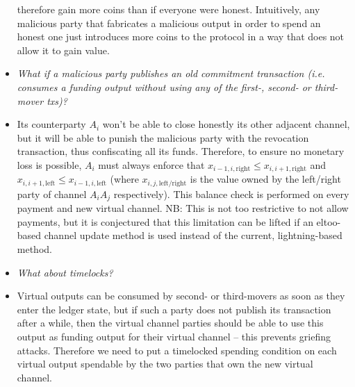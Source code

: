 \begin{itemize}
  therefore gain more coins than if everyone were honest. Intuitively, any
  malicious party that fabricates a malicious output in order to spend an honest
  one just introduces more coins to the protocol in a way that does not allow it
  to gain value.
  \item \emph{What if a malicious party publishes an old commitment transaction
  (i.e. consumes a funding output without using any of the first-, second- or
  third-mover txs)?}
  \item Its counterparty $A_i$ won't be able to close honestly its other
  adjacent channel, but it will be able to punish the malicious party with the
  revocation transaction, thus confiscating all its funds. Therefore, to ensure
  no monetary loss is possible, $A_i$ must always enforce that $x_{i-1, i,
  \mathrm{right}} \leq x_{i, i+1, \mathrm{right}}$ and $x_{i, i+1,
  \mathrm{left}} \leq x_{i-1, i, \mathrm{left}}$ (where $x_{i, j,
  \mathrm{left/right}}$ is the value owned by the left/right party of channel
  $A_i A_j$ respectively). This balance check is performed on every payment and
  new virtual channel. NB: This is not too restrictive to not allow payments,
  but it is conjectured that this limitation can be lifted if an eltoo-based
  channel update method is used instead of the current, lightning-based method.
  \item \emph{What about timelocks?}
  \item Virtual outputs can be consumed by second- or third-movers as
  soon as they enter the ledger state, but if such a party does not publish its
  transaction after a while, then the virtual channel parties should be able to
  use this output as funding output for their virtual channel -- this prevents
  griefing attacks. Therefore we need to put a timelocked spending condition on
  each virtual output spendable by the two parties that own the new virtual
  channel.


\end{itemize}
